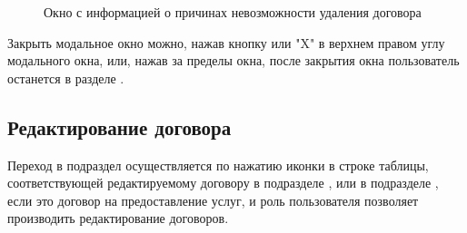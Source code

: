 \begin{figure}[H]
	\caption{Окно с информацией о причинах невозможности удаления договора}
	\label{agreement:delete_no}
\end{figure}

Закрыть модальное окно можно, нажав кнопку  или "X" в верхнем правом углу модального окна, или, нажав за пределы окна, после закрытия окна пользователь останется в разделе .\\

\subsection{Редактирование договора}\label{agreement:edit_section}
Переход в подраздел осуществляется по нажатию иконки  в строке таблицы, соответствующей редактируемому  договору в подразделе , или в подразделе , если это договор на предоставление услуг, и роль пользователя позволяет производить редактирование договоров.

